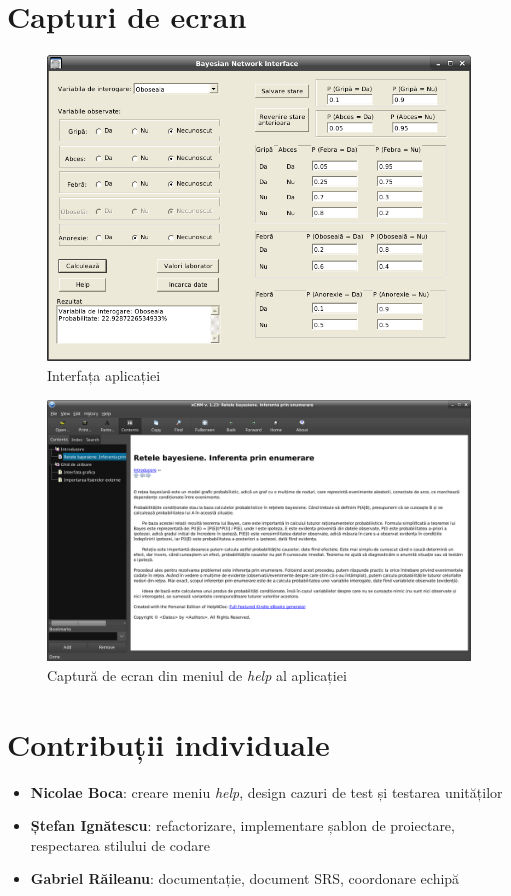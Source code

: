 \documentclass[12pt]{article}
\begin{document}
\section{Capturi de ecran}
	\begin{figure}[H]
		\centering
		\includegraphics [scale=0.5] {img/gui.png}
		\caption{Interfața aplicației}
	\end{figure}
	\begin{figure}[!h]
	\centering
	\includegraphics [scale=0.3] {img/help.png}
	\caption{Captură de ecran din meniul de \textit{help} al aplicației}
\end{figure}
\section{Contribuții individuale}
\begin{itemize}
	\item \textbf{Nicolae Boca}: creare meniu \textit{help}, design cazuri de test și testarea unităților
	\item \textbf{Ștefan Ignătescu}: refactorizare, implementare șablon de proiectare, respectarea stilului de codare
	\item \textbf{Gabriel Răileanu}: documentație, document SRS, coordonare echipă
\end{itemize}

\end{document}
